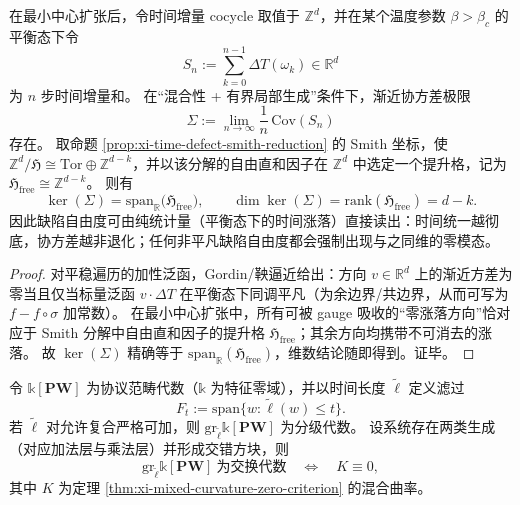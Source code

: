 \begin{proposition}\label{prop:xi-defect-free-rank-identifiable-by-covariance-kernel}
在最小中心扩张后，令时间增量 cocycle 取值于 \(\mathbb Z^d\)，并在某个温度参数 \(\beta>\beta_c\) 的平衡态下令
\[
S_n:=\sum_{k=0}^{n-1}\Delta T(\omega_k)\in\mathbb R^{d}
\]
为 \(n\) 步时间增量和。
在“混合性 + 有界局部生成”条件下，渐近协方差极限
\[
\Sigma:=\lim_{n\to\infty}\frac{1}{n}\,\mathrm{Cov}(S_n)
\]
存在。
取命题 \ref{prop:xi-time-defect-smith-reduction} 的 Smith 坐标，使
\(
\mathbb Z^d/\mathfrak H\cong \mathrm{Tor}\oplus \mathbb Z^{d-k}
\)，并以该分解的自由直和因子在 \(\mathbb Z^d\) 中选定一个提升格，记为 \(\mathfrak H_{\mathrm{free}}\cong\mathbb Z^{d-k}\)。
则有
\[
\ker(\Sigma)=\mathrm{span}_{\mathbb R}\bigl(\mathfrak H_{\mathrm{free}}\bigr),
\qquad
\dim\ker(\Sigma)=\mathrm{rank}(\mathfrak H_{\mathrm{free}})=d-k.
\]
因此缺陷自由度可由纯统计量（平衡态下的时间涨落）直接读出：时间统一越彻底，协方差越非退化；任何非平凡缺陷自由度都会强制出现与之同维的零模态。
\end{proposition}
\begin{proof}
对平稳遍历的加性泛函，Gordin/鞅逼近给出：方向 \(v\in\mathbb R^d\) 上的渐近方差为零当且仅当标量泛函 \(v\cdot\Delta T\) 在平衡态下同调平凡（为余边界/共边界，从而可写为 \(f-f\circ\sigma\) 加常数）。
在最小中心扩张中，所有可被 gauge 吸收的“零涨落方向”恰对应于 Smith 分解中自由直和因子的提升格 \(\mathfrak H_{\mathrm{free}}\)；其余方向均携带不可消去的涨落。
故 \(\ker(\Sigma)\) 精确等于 \(\mathrm{span}_{\mathbb R}(\mathfrak H_{\mathrm{free}})\)，维数结论随即得到。证毕。
\end{proof}

\begin{theorem}\label{thm:xi-time-filtration-pbw-graded-commutative}
令 \(\mathbb k[\mathbf{PW}]\) 为协议范畴代数（\(\mathbb k\) 为特征零域），并以时间长度 \(\widetilde{\ell}\) 定义滤过
\[
F_t:=\mathrm{span}\{w:\widetilde{\ell}(w)\le t\}.
\]
若 \(\widetilde{\ell}\) 对允许复合严格可加，则 \(\mathrm{gr}_{\widetilde{\ell}}\mathbb k[\mathbf{PW}]\) 为分级代数。
设系统存在两类生成（对应加法层与乘法层）并形成交错方块，则
\[
\mathrm{gr}_{\widetilde{\ell}}\mathbb k[\mathbf{PW}]\ \text{为交换代数}
\quad\Longleftrightarrow\quad
K\equiv 0,
\]
其中 \(K\) 为定理 \ref{thm:xi-mixed-curvature-zero-criterion} 的混合曲率。
\end{theorem}

